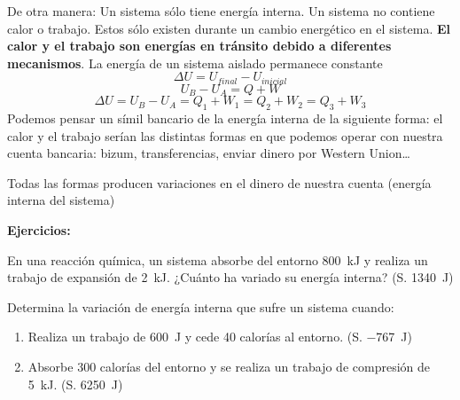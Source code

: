 \documentclass[
  spanish,
]{article}
\providecommand{\tightlist}{%
  \setlength{\itemsep}{0pt}\setlength{\parskip}{0pt}}
\begin{document}
\hfill{}De
otra manera: Un sistema sólo tiene energía interna. Un sistema no
contiene calor o trabajo. Estos sólo existen durante un cambio
energético en el sistema. \textbf{El calor y el trabajo son energías en
tránsito debido a diferentes mecanismos}. La energía de un sistema
aislado permanece constante \[\Delta U = U_{final} - U_{inicial}\]
\[U_{B} - U_{A} = Q + W\]
\[\Delta U = U_{B} - U_A = Q_1 + W_1 = Q_2 + W_2 = Q_3 + W_3\]
\hfill{}
Podemos pensar un símil bancario de la energía interna de la siguiente
forma: el calor y el trabajo serían las distintas formas en que podemos
operar con nuestra cuenta bancaria: bizum, transferencias, enviar dinero
por Western Union\ldots{}

Todas las formas producen variaciones en el dinero de nuestra cuenta
(energía interna del sistema)

\textbf{Ejercicios:}

\begin{exercise}En una reacción química, un sistema absorbe del entorno
\qty{800}{\kJ} y realiza un trabajo de expansión de \qty{2}{\kJ}.
¿Cuánto ha variado su energía interna? (S. \qty{1340}{\J})\end{exercise}

\begin{exercise}Determina la variación de energía interna que sufre un
sistema cuando:

\begin{enumerate}
\def\labelenumi{\alph{enumi})}
\tightlist
\item
  Realiza un trabajo de \qty{600}{\J} y cede 40 calorías al entorno. (S.
  \qty{-767}{\J})
\item
  Absorbe 300 calorías del entorno y se realiza un trabajo de compresión
  de \qty{5}{\kJ}. (S. \qty{6250}{\J})
\end{enumerate}

\end{exercise}
\end{document}
